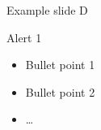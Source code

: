 \begin{frame}{Example slide D}
\begin{alertblock}{Alert 1}
\begin{itemize}
\item Bullet point 1
\pause
\item Bullet point 2
\item \dots
\end{itemize}
\end{alertblock}
\end{frame}
\questionframe
\lastframe
